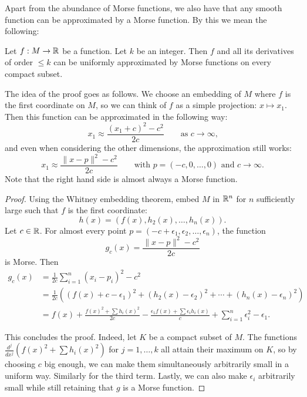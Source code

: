 Apart from the abundance of Morse functions, we also have that any smooth function can be approximated by a Morse function. By this we mean the following:
\begin{prop}
    Let $f: M \to  \mathbb{R}$ be a function.
    Let $k$ be an integer.
    Then $f$ and all its derivatives of order $\le k$ can be uniformly
    approximated by Morse functions on every compact subset.
\end{prop}

The idea of the proof goes as follows.
We choose an embedding of $M$ where $f$ is the first coordinate on $M$, so we can think of $f$ as a simple projection: $x \mapsto x_1$. 
Then this function can be approximated in the following way:
\[
    x_1 \approx \frac{(x_1+c)^2 - c^2}{2c} \qquad \text{as $c \to  \infty$,}
\]
and even when considering the other dimensions, the approximation still works:
\[
    x_1 \approx \frac{\|x - p\|^2 - c^2}{2c} \qquad \text{with $p = (-c, 0, \ldots, 0)$ and $c\to  \infty$}
.\] 
Note that the right hand side is almost always a Morse function.

\begin{proof}
    Using the Whitney embedding theorem, embed $M$ in $\mathbb{R}^{n}$ for $n$ sufficiently large such that $f$ is the first coordinate:
    \[
        h(x) = (f(x), h_2(x), \ldots, h_n(x))
    .\] 
    Let $c \in \mathbb{R}$. For almost every point $p = (-c + \epsilon_1, \epsilon_2, \ldots, \epsilon_n)$, the function
    \[
        g_c(x) = \frac{\|x - p\|^2 - c^2}{2c} 
    \] 
    is Morse.
    Then
    \begin{align*}
        g_c(x) &= \frac{1}{2c}  \sum_{i=1}^{n} (x_i - p_i)^2 - c^2\\
             &= \frac{1}{2c} \left((f(x) + c - \epsilon_1 )^2 + (h_2(x) - \epsilon_2)^2 + \cdots + (h_n(x) - \epsilon_n)^2\right)\\
             &= f(x) +  \frac{f(x)^2 + \sum h_i(x)^2}{2c} - \frac{\epsilon_1 f(x)  + \sum \epsilon_i h_i(x)}{c}  + \sum_{i=1}^{n} \epsilon_i^2 - \epsilon_1
    .\end{align*} 

    This concludes the proof.
    Indeed, let $K$ be a compact subset of $M$.
    The functions $\frac{d^{j}}{dx^{j}} (f(x)^2 + \sum h_i(x)^2)$ for $j = 1, \ldots,k$ all attain their maximum on $K$, so by choosing $c$ big enough, we can make them simultaneously arbitrarily small in a uniform way. Similarly for the third term.
    Lastly, we can also make $\epsilon_i$ arbitrarily small while still retaining that $g$ is a Morse function.
\end{proof}

